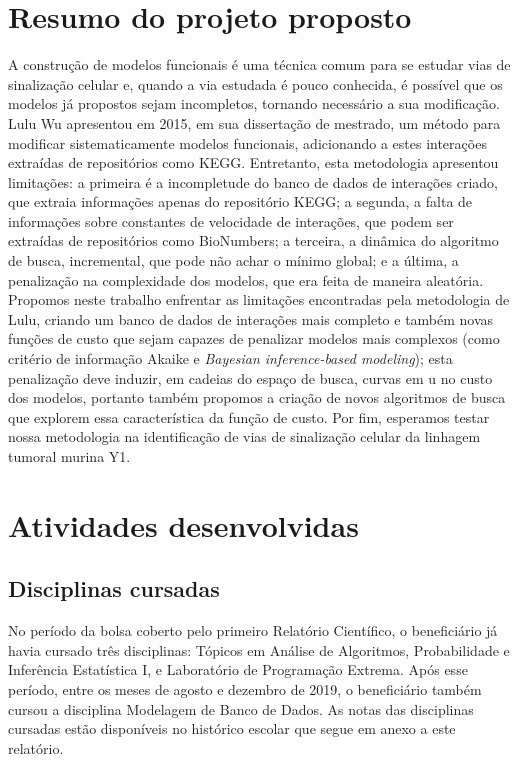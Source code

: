 \documentclass[12pt]{article}
\begin{document}
\section{Resumo do projeto proposto} \label{sec:resumo} %
A construção de modelos funcionais é uma técnica comum para se 
estudar vias de sinalização celular e, quando a via estudada é pouco
conhecida, é possível que os modelos já propostos sejam incompletos, 
tornando necessário a sua modificação.
Lulu Wu apresentou em 2015, em sua dissertação de mestrado, um método 
para  modificar sistematicamente modelos funcionais, adicionando a estes
interações extraídas de repositórios como KEGG. Entretanto, esta 
metodologia apresentou limitações: a primeira é a incompletude do banco 
de dados de interações criado, que extraia informações apenas do 
repositório KEGG; a segunda, a falta de informações sobre constantes 
de velocidade de interações, que podem ser extraídas de repositórios 
como BioNumbers; a terceira, a dinâmica do algoritmo de busca, 
incremental, que pode não achar o mínimo global; e a última, a 
penalização na complexidade dos modelos, que era feita de maneira 
aleatória. Propomos neste trabalho enfrentar as limitações encontradas
pela metodologia de Lulu, criando um banco de dados de interações mais
completo e também novas funções de custo que sejam capazes de 
penalizar modelos mais complexos (como critério de informação Akaike e 
{\em Bayesian inference-based modeling}); esta penalização deve induzir,
em cadeias do  espaço de busca, curvas em u no custo dos modelos, 
portanto também propomos a criação de novos algoritmos de busca que 
explorem essa característica da função de custo. Por fim, esperamos 
testar nossa metodologia na identificação de vias de sinalização celular 
da linhagem tumoral murina Y1.



\section{Atividades desenvolvidas}

\subsection{Disciplinas cursadas}
No período da bolsa coberto pelo primeiro Relatório Científico, o beneficiário já havia cursado três disciplinas: Tópicos em Análise de Algoritmos, Probabilidade e Inferência Estatística I, e Laboratório de Programação Extrema. Após esse período, entre os meses de agosto e dezembro de 2019, o beneficiário também cursou a disciplina Modelagem de Banco de Dados. As notas das disciplinas cursadas estão disponíveis no histórico escolar que segue em anexo a este relatório.
\end{document}
